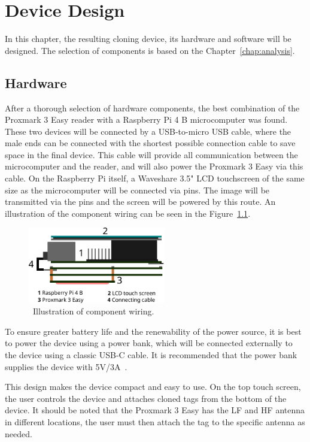 \chapter{Device Design}
\label{chap:design}


In this chapter, the resulting cloning device, its hardware and software will be designed. The selection of components is based on the Chapter~\ref{chap:analysis}.

\section{Hardware}

After a thorough selection of hardware components, the best combination of the Proxmark 3 Easy reader with a Raspberry Pi 4 B microcomputer was found. These two devices will be connected by a USB-to-micro USB cable, where the male ends can be connected with the shortest possible connection cable to save space in the final device. This cable will provide all communication between the microcomputer and the reader, and will also power the Proxmark 3 Easy via this cable. On the Raspberry Pi itself, a Waveshare 3.5" LCD touchscreen of the same size as the microcomputer will be connected via pins. The image will be transmitted via the pins and the screen will be powered by this route. An illustration of the component wiring can be seen in the Figure~\ref{fig:devicescheme}. 


\begin{figure}[ht]
  \centering
  \includegraphics[width=6cm]{text/design/device_scheme.pdf}
  \caption[Illustration of component wiring.]{~Illustration of component wiring.}
  \label{fig:devicescheme}
\end{figure}

To ensure greater battery life and the renewability of the power source, it is best to power the device using a power bank, which will be connected externally to the device using a classic USB-C cable. It is recommended that the power bank supplies the device with 5V/3A~\cite{raspberrydoc}.

This design makes the device compact and easy to use. On the top touch screen, the user controls the device and attaches cloned tags from the bottom of the device. It should be noted that the Proxmark 3 Easy has the LF and HF antenna in different locations, the user must then attach the tag to the specific antenna as needed.

